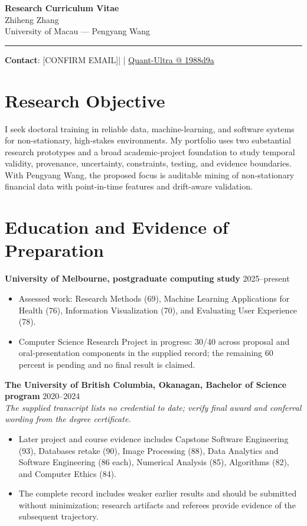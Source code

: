 \documentclass[11pt]{article}
\makeatletter
\newcommand{\ApplicantName}{Zhiheng Zhang}
\newcommand{\ApplicantEmail}{[CONFIRM EMAIL]}
\newcommand{\ApplicantPhone}{[CONFIRM PHONE]}
\newcommand{\ApplicantGitHub}{\href{https://github.com/zhiheng-zhang-Mera/Quant-Ultra/tree/1988d9a8530da91a8158de864d098ea869098923}{Quant-Ultra @ 1988d9a}}
\makeatother
\begin{document}
\begin{center}
{\LARGE\bfseries Research Curriculum Vitae}\\[0.25em]
{\large \ApplicantName}\\
University of Macau --- Pengyang Wang
\end{center}
\vspace{0.35em}\hrule\vspace{0.65em}

\textbf{Contact}: \ApplicantEmail\quad | \quad \ApplicantPhone\quad | \quad \ApplicantGitHub

\section*{Research Objective}
I seek doctoral training in reliable data, machine-learning, and software systems for non-stationary, high-stakes environments. My portfolio uses two substantial research prototypes and a broad academic-project foundation to study temporal validity, provenance, uncertainty, constraints, testing, and evidence boundaries. With Pengyang Wang, the proposed focus is auditable mining of non-stationary financial data with point-in-time features and drift-aware validation.

\section*{Education and Evidence of Preparation}
\textbf{University of Melbourne, postgraduate computing study} \hfill 2025--present
\begin{itemize}
\item Assessed work: Research Methods (69), Machine Learning Applications for Health (76), Information Visualization (70), and Evaluating User Experience (78).
\item Computer Science Research Project in progress: 30/40 across proposal and oral-presentation components in the supplied record; the remaining 60 percent is pending and no final result is claimed.
\end{itemize}

\textbf{The University of British Columbia, Okanagan, Bachelor of Science program} \hfill 2020--2024\\
\textit{The supplied transcript lists no credential to date; verify final award and conferral wording from the degree certificate.}
\begin{itemize}
\item Later project and course evidence includes Capstone Software Engineering (93), Databases retake (90), Image Processing (88), Data Analytics and Software Engineering (86 each), Numerical Analysis (85), Algorithms (82), and Computer Ethics (84).
\item The complete record includes weaker earlier results and should be submitted without minimization; research artifacts and referees provide evidence of the subsequent trajectory.
\end{itemize}
\end{document}
